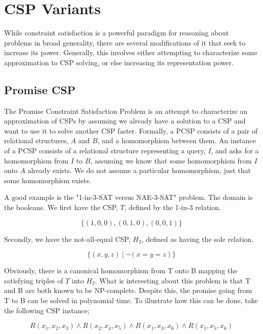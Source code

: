 \section{CSP Variants}\label{sec:variants}

While constraint satisfaction is a powerful paradigm for reasoning about problems in broad generality, there are several modifications of it that seek to increase its power. Generally, this involves either attempting to characterize some approximation to CSP solving, or else increasing its representation power. 

\subsection{Promise CSP}\label{sec:promise}

The Promise Constraint Satisfaction Problem is an attempt to characterize an approximation of CSPs by assuming we already have a solution to a CSP and want to use it to solve another CSP faster. Formally, a PCSP consists of a pair of relational structures, $A$ and $B$, and a homomorphism between them. An instance of a PCSP consists of a relational structure representing a query, $I$, and asks for a homomorphism from $I$ to $B$, assuming we know that some homomorphism from $I$ onto $A$ already exists. We do not assume a particular homomorphism, just that some homomorphism exists.

A good example is the "1-in-3-SAT versus NAE-3-SAT" problem. The domain is the booleans. We first have the CSP, $T$, defined by the 1-in-3 relation.

\begin{equation}
    \{(1, 0, 0), (0, 1, 0), (0, 0, 1)\}
\end{equation}

Secondly, we have the not-all-equal CSP, $H_2$, defined as having the sole relation.

\begin{equation}
   \{(x, y, z)\ |\ \neg (x = y = z) \}
\end{equation}

Obviously, there is a canonical homomorphism from T onto B mapping the satisfying triples of $T$ into $H_2$. What is interesting about this problem is that T and B are both known to be NP-complete. Despite this, the promise going from T to B can be solved in polynomial time. To illustrate how this can be done, take the following CSP instance;

\begin{equation}
    R(x_1, x_2, x_3) \wedge R(x_2, x_4, x_5) \wedge R(x_1, x_3, x_6) \wedge R(x_1, x_5, x_6)
\end{equation}

